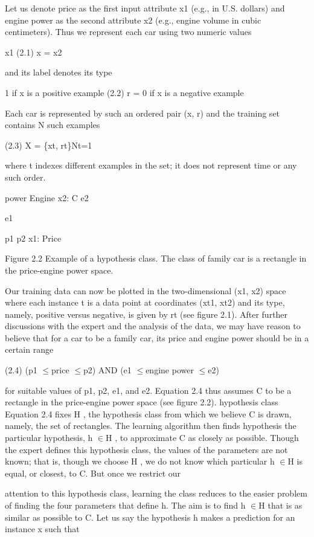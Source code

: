 Let us denote price as the first input attribute x1 (e.g., in U.S. dollars) and engine power as the second attribute x2 (e.g., engine volume in cubic centimeters). Thus we represent each car using two numeric values

x1 (2.1) x = x2

and its label denotes its type

1 if x is a positive example (2.2) r = 0 if x is a negative example

Each car is represented by such an ordered pair (x, r) and the training set contains N such examples

(2.3) X = \{xt, rt\}Nt=1

where t indexes different examples in the set; it does not represent time or any such order.

power Engine x2: C e2

e1

p1 p2 x1: Price

Figure 2.2 Example of a hypothesis class. The class of family car is a rectangle in the price-engine power space.

Our training data can now be plotted in the two-dimensional (x1, x2) space where each instance t is a data point at coordinates (xt1, xt2) and its type, namely, positive versus negative, is given by rt (see figure 2.1). After further discussions with the expert and the analysis of the data, we may have reason to believe that for a car to be a family car, its price and engine power should be in a certain range

(2.4) (p1 $\leq$price $\leq$p2) AND (e1 $\leq$engine power $\leq$e2)

for suitable values of p1, p2, e1, and e2. Equation 2.4 thus assumes C to be a rectangle in the price-engine power space (see figure 2.2). hypothesis class Equation 2.4 fixes H , the hypothesis class from which we believe C is drawn, namely, the set of rectangles. The learning algorithm then finds hypothesis the particular hypothesis, h $\in$H , to approximate C as closely as possible. Though the expert defines this hypothesis class, the values of the parameters are not known; that is, though we choose H , we do not know which particular h $\in$H is equal, or closest, to C. But once we restrict our

attention to this hypothesis class, learning the class reduces to the easier problem of finding the four parameters that define h. The aim is to find h $\in$H that is as similar as possible to C. Let us say the hypothesis h makes a prediction for an instance x such that

